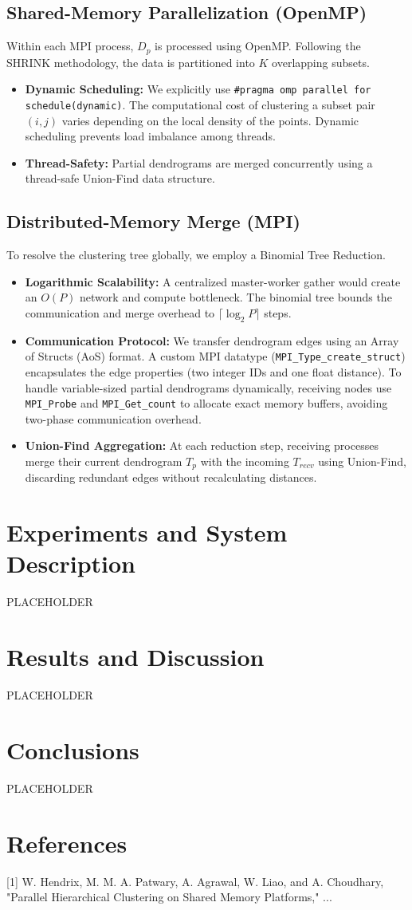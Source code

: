 \subsection{Shared-Memory Parallelization (OpenMP)}
Within each MPI process, $D_p$ is processed using OpenMP. Following the SHRINK methodology, the data is partitioned into $K$ overlapping subsets.
\begin{itemize}
    \item \textbf{Dynamic Scheduling:} We explicitly use \texttt{\#pragma omp parallel for schedule(dynamic)}. The computational cost of clustering a subset pair $(i, j)$ varies depending on the local density of the points. Dynamic scheduling prevents load imbalance among threads.
    \item \textbf{Thread-Safety:} Partial dendrograms are merged concurrently using a thread-safe Union-Find data structure.
\end{itemize}

\subsection{Distributed-Memory Merge (MPI)}
To resolve the clustering tree globally, we employ a Binomial Tree Reduction.
\begin{itemize}
    \item \textbf{Logarithmic Scalability:} A centralized master-worker gather would create an $O(P)$ network and compute bottleneck. The binomial tree bounds the communication and merge overhead to $\lceil \log_2 P \rceil$ steps.
    \item \textbf{Communication Protocol:} We transfer dendrogram edges using an Array of Structs (AoS) format. A custom MPI datatype (\texttt{MPI\_Type\_create\_struct}) encapsulates the edge properties (two integer IDs and one float distance). To handle variable-sized partial dendrograms dynamically, receiving nodes use \texttt{MPI\_Probe} and \texttt{MPI\_Get\_count} to allocate exact memory buffers, avoiding two-phase communication overhead.
    \item \textbf{Union-Find Aggregation:} At each reduction step, receiving processes merge their current dendrogram $T_p$ with the incoming $T_{recv}$ using Union-Find, discarding redundant edges without recalculating distances.
\end{itemize}

\section{Experiments and System Description}
PLACEHOLDER

\section{Results and Discussion}
PLACEHOLDER

\section{Conclusions}
PLACEHOLDER

\section{References}
[1] W. Hendrix, M. M. A. Patwary, A. Agrawal, W. Liao, and A. Choudhary, "Parallel Hierarchical Clustering on Shared Memory Platforms," ...

